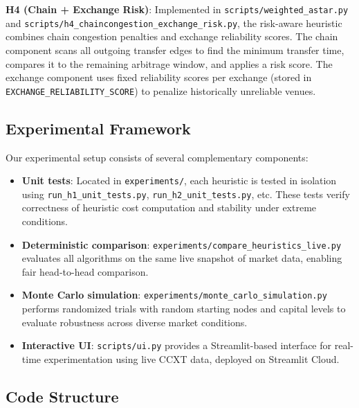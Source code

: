 \documentclass[11pt]{article}
\begin{document}
\textbf{H4 (Chain + Exchange Risk)}: Implemented in \texttt{scripts/weighted\_astar.py} and \texttt{scripts/h4\_chaincongestion\_exchange\_risk.py}, the risk-aware heuristic combines chain congestion penalties and exchange reliability scores. The chain component scans all outgoing transfer edges to find the minimum transfer time, compares it to the remaining arbitrage window, and applies a risk score. The exchange component uses fixed reliability scores per exchange (stored in \texttt{EXCHANGE\_RELIABILITY\_SCORE}) to penalize historically unreliable venues.

\subsection{Experimental Framework}

Our experimental setup consists of several complementary components:
\begin{itemize}
\item \textbf{Unit tests}: Located in \texttt{experiments/}, each heuristic is tested in isolation using \texttt{run\_h1\_unit\_tests.py}, \texttt{run\_h2\_unit\_tests.py}, etc. These tests verify correctness of heuristic cost computation and stability under extreme conditions.
\item \textbf{Deterministic comparison}: \texttt{experiments/compare\_heuristics\_live.py} evaluates all algorithms on the same live snapshot of market data, enabling fair head-to-head comparison.
\item \textbf{Monte Carlo simulation}: \texttt{experiments/monte\_carlo\_simulation.py} performs randomized trials with random starting nodes and capital levels to evaluate robustness across diverse market conditions.
\item \textbf{Interactive UI}: \texttt{scripts/ui.py} provides a Streamlit-based interface for real-time experimentation using live CCXT data, deployed on Streamlit Cloud.
\end{itemize}

\subsection{Code Structure}
\end{document}
